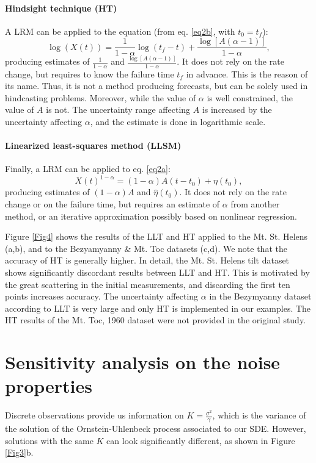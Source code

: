 \documentclass{article}
\begin{document}
\paragraph{Hindsight technique (HT)}
A LRM can be applied to the equation (from eq. \ref{eq2b}, with $t_0=t_f$):
$$\log(X(t))=\frac{1}{1-\alpha}\log(t_f-t)+\frac{\log[A(\alpha-1)]}{1-\alpha},$$
producing estimates of $\frac{1}{1-\alpha}$ and $\frac{\log[A(\alpha-1)]}{1-\alpha}$. It does not rely on the rate change, but requires to know the failure time $t_f$ in advance. This is the reason of its name. Thus, it is not a method producing forecasts, but can be solely used in hindcasting problems. Moreover, while the value of $\alpha$ is well constrained, the value of $A$ is not. The uncertainty range affecting $A$ is increased by the uncertainty affecting $\alpha$, and the estimate is done in logarithmic scale.

\paragraph{Linearized least-squares method (LLSM)}
Finally, a LRM can be applied to eq. \ref{eq2a}:
$$X(t)^{1-\alpha}=(1-\alpha)A(t-t_0)+\eta(t_0),$$
producing estimates of $(1-\alpha)A$ and $\hat\eta(t_0)$. It does not rely on the rate change or on the failure time, but requires an estimate of $\alpha$ from another method, or an iterative approximation possibly based on nonlinear regression.

Figure \ref{Fig4} shows the results of the LLT and HT applied to the Mt. St. Helens (a,b), and to the Bezyamyanny \& Mt. Toc datasets (c,d). We note that the accuracy of HT is generally higher. In detail, the Mt. St. Helens tilt dataset shows significantly discordant results between LLT and HT. This is motivated by the great scattering in the initial measurements, and discarding the first ten points increases accuracy. The uncertainty affecting $\alpha$ in the Bezymyanny dataset according to LLT is very large and only HT is implemented in our examples. The HT results of the Mt. Toc, 1960 dataset were not provided in the original study.
\newpage
\section{Sensitivity analysis on the noise properties}\label{A-2}
Discrete observations provide us information on $K=\frac{\sigma^2}{\gamma}$, which is the variance of the solution of the Ornstein-Uhlenbeck process associated to our SDE. However, solutions with the same $K$ can look significantly different, as shown in Figure \ref{Fig3}b.
\end{document}
